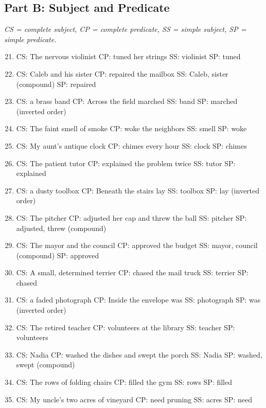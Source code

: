 \documentclass[11pt]{article}
\begin{document}
\subsection*{Part B: Subject and Predicate}
\noindent\textit{CS = complete subject, CP = complete predicate, SS = simple subject, SP = simple predicate.}
\begin{enumerate}\setcounter{enumi}{20}
  \item CS: The nervous violinist \quad CP: tuned her strings \quad SS: violinist \quad SP: tuned
  \item CS: Caleb and his sister \quad CP: repaired the mailbox \quad SS: Caleb, sister (compound) \quad SP: repaired
  \item CS: a brass band \quad CP: Across the field marched \quad SS: band \quad SP: marched \quad (inverted order)
  \item CS: The faint smell of smoke \quad CP: woke the neighbors \quad SS: smell \quad SP: woke
  \item CS: My aunt's antique clock \quad CP: chimes every hour \quad SS: clock \quad SP: chimes
  \item CS: The patient tutor \quad CP: explained the problem twice \quad SS: tutor \quad SP: explained
  \item CS: a dusty toolbox \quad CP: Beneath the stairs lay \quad SS: toolbox \quad SP: lay \quad (inverted order)
  \item CS: The pitcher \quad CP: adjusted her cap and threw the ball \quad SS: pitcher \quad SP: adjusted, threw (compound)
  \item CS: The mayor and the council \quad CP: approved the budget \quad SS: mayor, council (compound) \quad SP: approved
  \item CS: A small, determined terrier \quad CP: chased the mail truck \quad SS: terrier \quad SP: chased
  \item CS: a faded photograph \quad CP: Inside the envelope was \quad SS: photograph \quad SP: was \quad (inverted order)
  \item CS: The retired teacher \quad CP: volunteers at the library \quad SS: teacher \quad SP: volunteers
  \item CS: Nadia \quad CP: washed the dishes and swept the porch \quad SS: Nadia \quad SP: washed, swept (compound)
  \item CS: The rows of folding chairs \quad CP: filled the gym \quad SS: rows \quad SP: filled
  \item CS: My uncle's two acres of vineyard \quad CP: need pruning \quad SS: acres \quad SP: need
\end{enumerate}
\end{document}
